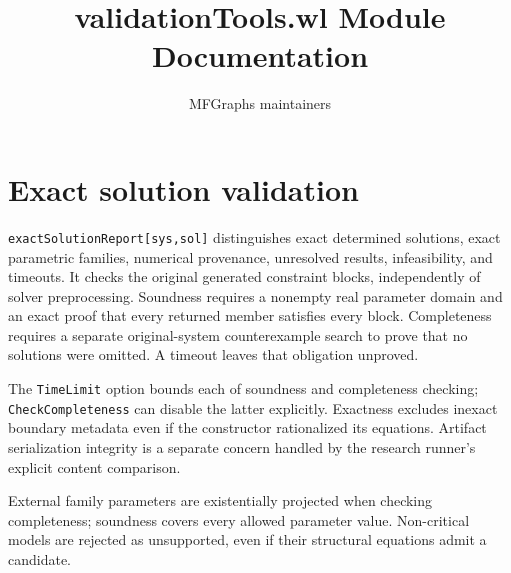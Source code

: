 \documentclass[11pt]{article}
\title{validationTools.wl Module Documentation}
\author{MFGraphs maintainers}
\date{}
\begin{document}
\maketitle
\section{Exact solution validation}
\texttt{exactSolutionReport[sys,sol]} distinguishes exact determined solutions,
exact parametric families, numerical provenance, unresolved results, infeasibility,
and timeouts. It checks the original generated constraint blocks, independently
of solver preprocessing. Soundness requires a nonempty real parameter domain and
an exact proof that every returned member satisfies every block. Completeness
requires a separate original-system counterexample search to prove that no
solutions were omitted. A timeout leaves that obligation unproved.

The \texttt{TimeLimit} option bounds each of soundness and completeness checking;
\texttt{CheckCompleteness} can disable the latter explicitly. Exactness excludes
inexact boundary metadata even if the constructor rationalized its equations.
Artifact serialization integrity is a separate concern handled by the research
runner's explicit content comparison.

External family parameters are existentially projected when checking completeness;
soundness covers every allowed parameter value. Non-critical models are rejected
as unsupported, even if their structural equations admit a candidate.
\end{document}
